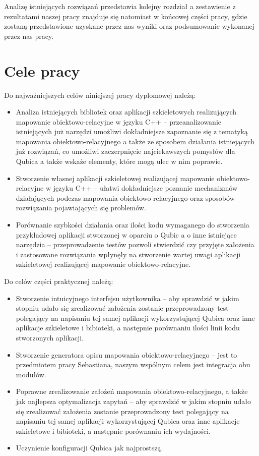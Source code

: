 \documentclass[12pt]{report}
\begin{document}
Analizę istniejących rozwiązań przedstawia kolejny rozdział a zestawienie z rezultatami naszej pracy znajduje się natomiast w końcowej części pracy, gdzie zostaną
przedstawione uzyskane przez nas wyniki oraz podsumowanie wykonanej przez nas pracy.

\section{Cele pracy} %

Do najważniejszych celów niniejszej pracy dyplomowej należą:

\begin{itemize}
\item Analiza istniejących bibliotek oraz aplikacji szkieletowych realizujących ma\-po\-wa\-nie obiektowo-relacyjne w języku C++ -- przeanalizowanie istniejących już narzędzi
umożliwi dokładniejsze zapoznanie się z tematyką mapowania obiektowo-relacyjnego a także ze sposobem działania istniejących już rozwiązań, co umożliwi zaczerpnięcie 
najciekawszych pomysłów dla Qubica a także wskaże elementy, które mogą ulec w nim poprawie.
\item Stworzenie własnej aplikacji szkieletowej realizującej mapowanie obiektowo-relacyjne w języku C++ -- ułatwi dokładniejsze poznanie mechanizmów dzia\-łających
podczas mapowania obiektowo-relacyjnego oraz sposobów ro\-zwią\-zania pojawiających się problemów.

\item Porównanie szybkości działania oraz ilości kodu wymaganego do stworzenia przykładowej aplikacji stworzonej w oparciu o Qubic a o inne istniejące na\-rzędzia -- 
przeprowadzenie testów pozwoli stwierdzić czy przyjęte założenia i zastosowane rozwiązania wpłynęły na stworzenie wartej uwagi aplikacji szkieletowej realizującej
mapowanie obiektowo-relacyjne.
\end{itemize}

Do celów części praktycznej należą:

\begin{itemize}
\item Stworzenie intuicyjnego interfejsu użytkownika -- aby sprawdzić w jakim stopniu udało się zrealizować założenia zostanie przeprowadzony test po\-le\-ga\-ją\-cy na 
napisaniu tej samej aplikacji wykorzystującej Qubica oraz inne aplikacje szkieletowe i bibioteki, a następnie porównaniu ilości linii kodu stworzonych aplikacji.
\item Stworzenie generatora opisu mapowania obiektowo-relacyjnego -- jest to przed\-mio\-tem pracy Sebastiana, naszym wspólnym celem jest integracja obu modułów.
\item Poprawne zrealizowanie założeń mapowania obiektowo-relacyjnego, a także jak najlepsza optymalizacja zapytań -- aby sprawdzić w jakim stopniu udało się zrealizować
założenia zostanie przeprowadzony test polegający na napisaniu tej samej aplikacji wykorzystującej Qubica oraz inne aplikacje szkieletowe i bibioteki, a następnie porównaniu
ich wydajności.
\item Uczynienie konfiguracji Qubica jak najprostszą.
\end{itemize}
\end{document}
